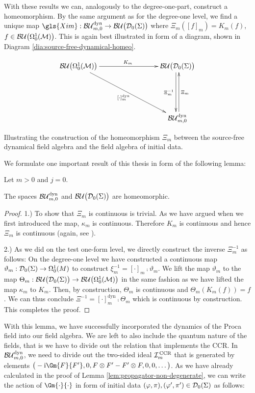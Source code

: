 With these results we can, analogously to the degree-one-part, construct a homeomorphism.
By the same argument as for the degree-one level, we find a unique map $\gls{Xim} : \BUmzdyn \to \BU\big( \Dzs \big)$ where $\Xi_m ([f]_m) = K_m(f)$, $f \in {\mathcal{BU}\big(\Omega^1_0(\ensuremath{\mathcal{M}})\big)}$. This is again best illustrated in form of a diagram, shown in Diagram \ref{dia:source-free-dynamical-homeo}.
%
\begin{table}
\begin{displaymath}
\xymatrix @R=20mm @C=30mm
{
	\BUOmega  \ar[r]^{K_m} \ar[dr]_{[\cdot]_m^{\text{dyn}}} 	& \BU\big(\Dzs\big) \ar@<-.5ex>[d]_{\Xi^{-1}_m}  		\\
	&  \BUmzdyn  	       \ar@<-.5ex>[u]_{\Xi_m}
}
\end{displaymath}
\caption{Illustrating the construction of the homeomorphism $\Xi_m$ between the source-free dynamical field algebra and the field algebra of initial data.}
\label{dia:source-free-dynamical-homeo}
\end{table}
%
We formulate one important result of this thesis in form of the following lemma:
%
\begin{lemma}\label{lem:field-algebra-homeomorphism}
	Let $m>0$ and $j=0$.
	\begin{center}
The spaces $\mathcal{BU}_{m,0}^\text{dyn}$ and $\mathcal{BU}\big( \mathcal{D}_{0}(\Sigma) \big)$ are homeomorphic.
	\end{center}
\end{lemma}
\begin{proof}
	1.) To show that $\Xi_m$ is continuous is trivial. As we have argued when we first introduced the map, $\kappa_m$ is continuous. Therefore $K_m$ is continuous and hence $\Xi_m$ is continuous (again, see \cite[Proposition 4.6]{treves}).\par
	2.) As we did on the test one-form level, we directly construct the inverse $\Xi_m^{-1}$ as follows:
	On the degree-one level we have constructed a continuous map $\vartheta_m : \mathcal{D}_{0}(\Sigma) \to \Omega^1_0 (M)$ to construct $\xi_m^{-1} = [\cdot]_m \comp \vartheta_m$.
	We lift the map $\vartheta_m$ to the map $\Theta_m : \mathcal{BU}\big( \mathcal{D}_{0}(\Sigma) \big) \to {\mathcal{BU}\big(\Omega^1_0(\ensuremath{\mathcal{M}})\big)}$ in the same fashion as we have lifted the map $\kappa_m$ to $K_m$. Then, by construction, $\Theta_m$ is continuous and $\Theta_m(K_m(f)) = f$.
	We can thus conclude $\Xi^{-1} = [\cdot]_m^\text{dyn} \comp \Theta_m$ which is continuous by construction.
	This completes the proof.
\end{proof}
With this lemma, we have successfully incorporated the dynamics of the Proca field into our field algebra. We are left to also include the quantum nature of the fields, that is we have to divide out the relation that implements the CCR. In $\mathcal{BU}_{m,0}^\text{dyn}$, we need to divide out the two-sided ideal $\mathcal{I}_m^\text{\,CCR}$ that is generated by elements $\big(-\i \Gm{F}{F'}, 0 , F \otimes F' - F' \otimes F , 0 , 0 , \dots\big)$. As we have already calculated in the proof of Lemma \ref{lem:propagator-non-degenerate}, we can write the action of $\Gm{\cdot}{\cdot}$ in form of initial data $(\varphi, \pi), (\varphi', \pi') \in \mathcal{D}_{0}(\Sigma)$ as follows: \vspace{-.6cm}
